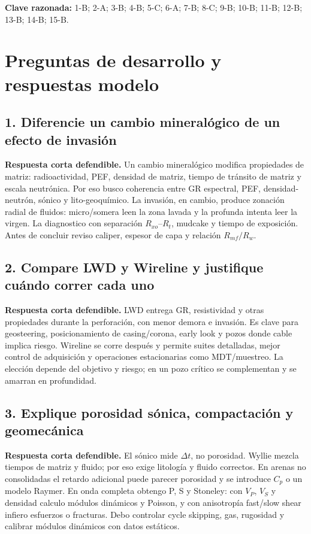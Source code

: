 \documentclass[10.5pt,a4paper]{article}
\newcommand{\oral}[1]{\par\textcolor{petro}{\textbf{Respuesta corta defendible.} #1}\par}
\begin{document}
\textbf{Clave razonada:} 1-B; 2-A; 3-B; 4-B; 5-C; 6-A; 7-B; 8-C; 9-B; 10-B; 11-B; 12-B; 13-B; 14-B; 15-B.

\section{Preguntas de desarrollo y respuestas modelo}

\subsection*{1. Diferencie un cambio mineral\'ogico de un efecto de invasi\'on}

\oral{Un cambio mineral\'ogico modifica propiedades de matriz: radioactividad, PEF, densidad de matriz, tiempo de tr\'ansito de matriz y escala neutr\'onica. Por eso busco coherencia entre GR espectral, PEF, densidad-neutr\'on, s\'onico y lito-geoqu\'imico. La invasi\'on, en cambio, produce zonaci\'on radial de fluidos: micro/somera leen la zona lavada y la profunda intenta leer la virgen. La diagnostico con separaci\'on $R_{xo}$--$R_t$, mudcake y tiempo de exposici\'on. Antes de concluir reviso caliper, espesor de capa y relaci\'on $R_{mf}/R_w$.}

\subsection*{2. Compare LWD y Wireline y justifique cu\'ando correr cada uno}

\oral{LWD entrega GR, resistividad y otras propiedades durante la perforaci\'on, con menor demora e invasi\'on. Es clave para geosteering, posicionamiento de casing/corona, early look y pozos donde cable implica riesgo. Wireline se corre despu\'es y permite suites detalladas, mejor control de adquisici\'on y operaciones estacionarias como MDT/muestreo. La elecci\'on depende del objetivo y riesgo; en un pozo cr\'itico se complementan y se amarran en profundidad.}

\subsection*{3. Explique porosidad s\'onica, compactaci\'on y geomec\'anica}

\oral{El s\'onico mide $\Delta t$, no porosidad. Wyllie mezcla tiempos de matriz y fluido; por eso exige litolog\'ia y fluido correctos. En arenas no consolidadas el retardo adicional puede parecer porosidad y se introduce $C_p$ o un modelo Raymer. En onda completa obtengo P, S y Stoneley: con $V_P$, $V_S$ y densidad calculo m\'odulos din\'amicos y Poisson, y con anisotrop\'ia fast/slow shear infiero esfuerzos o fracturas. Debo controlar cycle skipping, gas, rugosidad y calibrar m\'odulos din\'amicos con datos est\'aticos.}
\end{document}
